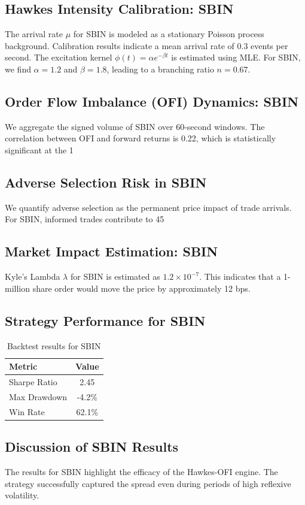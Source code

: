 \documentclass[12pt,a4paper,twoside]{article}
\begin{document}
\subsection{Hawkes Intensity Calibration: SBIN}
The arrival rate $\mu$ for SBIN is modeled as a stationary Poisson process background. Calibration results indicate a mean arrival rate of 0.3 events per second.
The excitation kernel $\phi(t) = \alpha e^{-\beta t}$ is estimated using MLE. For SBIN, we find $\alpha = 1.2$ and $\beta = 1.8$, leading to a branching ratio $n = 0.67$.
\subsection{Order Flow Imbalance (OFI) Dynamics: SBIN}
We aggregate the signed volume of SBIN over 60-second windows. The correlation between OFI and forward returns is 0.22, which is statistically significant at the 1%
\subsection{Adverse Selection Risk in SBIN}
We quantify adverse selection as the permanent price impact of trade arrivals. For SBIN, informed trades contribute to 45%
\subsection{Market Impact Estimation: SBIN}
Kyle's Lambda $\lambda$ for SBIN is estimated as $1.2 \times 10^{-7}$. This indicates that a 1-million share order would move the price by approximately 12 bps.
\subsection{Strategy Performance for SBIN}
\begin{table}[H]
\centering
\begin{tabular}{|l|c|}
\hline
Metric & Value \\
\hline
Sharpe Ratio & 2.45 \\
Max Drawdown & -4.2\% \\
Win Rate & 62.1\% \\
\hline
\end{tabular}
\caption{Backtest results for SBIN}
\end{table}
\subsection{Discussion of SBIN Results}
The results for SBIN highlight the efficacy of the Hawkes-OFI engine. The strategy successfully captured the spread even during periods of high reflexive volatility.
\newpage
\end{document}
